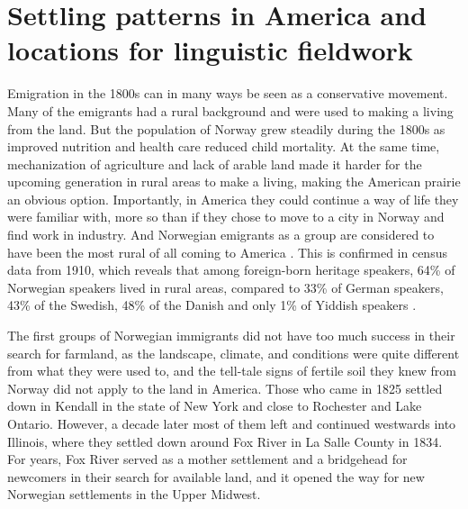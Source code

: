 \documentclass[output=paper]{langscibook}
\begin{document}
\section{Settling patterns in America and locations for linguistic fieldwork}\label{sec:hjelde:4}
\largerpage[-1]
Emigration in the 1800s can in many ways be seen as a conservative movement. Many of the emigrants had a rural background and were used to making a living from the land. But the population of Norway grew steadily during the 1800s as improved nutrition and health care reduced child mortality. At the same time, mechanization of agriculture and lack of arable land made it harder for the upcoming generation in rural areas to make a living, making the American prairie an obvious option. Importantly, in America they could continue a way of life they were familiar with, more so than if they chose to move to a city in Norway and find work in industry. And Norwegian emigrants as a group are considered to have been the most rural of all coming to America \citep[62]{Østrem2019}. This is confirmed in census data from 1910, which reveals that among foreign-born heritage speakers, 64\% of Norwegian speakers lived in rural areas, compared to 33\% of German speakers, 43\% of the Swedish, 48\% of the Danish and only 1\% of Yiddish speakers \citep[387]{Labov1998}.

The first groups of Norwegian immigrants did not have too much success in their search for farmland, as the landscape, climate, and conditions were quite different from what they were used to, and the tell-tale signs of fertile soil they knew from Norway did not apply to the land in America. Those who came in 1825 settled down in Kendall in the state of New York and close to Rochester and Lake Ontario. However, a decade later most of them left and continued westwards into Illinois, where they settled down around Fox River in La Salle County in 1834. For years, Fox River served as a mother settlement and a bridgehead for newcomers in their search for available land, and it opened the way for new Norwegian settlements in the Upper Midwest. 
\end{document}
